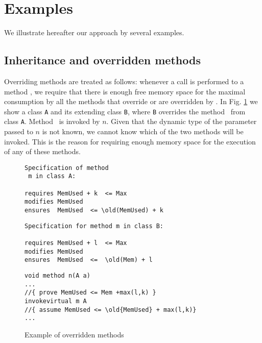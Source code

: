 
\section{Examples}\label{sec:examples}
We illustrate hereafter our approach by several examples. 

\subsection{Inheritance and overridden methods} Overriding methods are treated as follows: whenever a call is performed to a method \method,
we require that there is enough free memory space for the maximal
consumption by all the  methods that override or are overridden by
\method. In Fig. \ref{classExt} we show a class \verb!A! and its
extending class \verb!B!, where \verb!B! overrides the method \method\ from class \verb!A!. Method \method\ is invoked by $n$. Given that the dynamic type of the parameter passed to $n$ is not known, we cannot know which of the two
methods will be invoked. This is the reason for requiring enough memory space for the execution of any of these methods.

\begin{figure}[!htp]
\begin{frameit}
\begin{center}
\begin{minipage}[t]{110mm}
\begin{lstlisting}[frame=trbl]
Specification of method
 m in class A:

requires MemUsed + k  <= Max 
modifies MemUsed 
ensures  MemUsed  <= \old(MemUsed) + k
\end{lstlisting}

\begin{lstlisting}[frame=trbl]
Specification for method m in class B:

requires MemUsed + l  <= Max 
modifies MemUsed 
ensures  MemUsed  <=  \old(Mem) + l
\end{lstlisting}

\end{minipage}

\begin{minipage}[t]{110mm}
\begin{lstlisting}[frame=trbl]
void method n(A a)
...
//{ prove MemUsed <= Mem +max(l,k) }
invokevirtual m A
//{ assume MemUsed <= \old{MemUsed} + max(l,k)}
...
\end{lstlisting}
\end{minipage}

\caption{\sc Example of overridden methods}
\label{classExt}
\end{center}
\end{frameit}
\end{figure}


